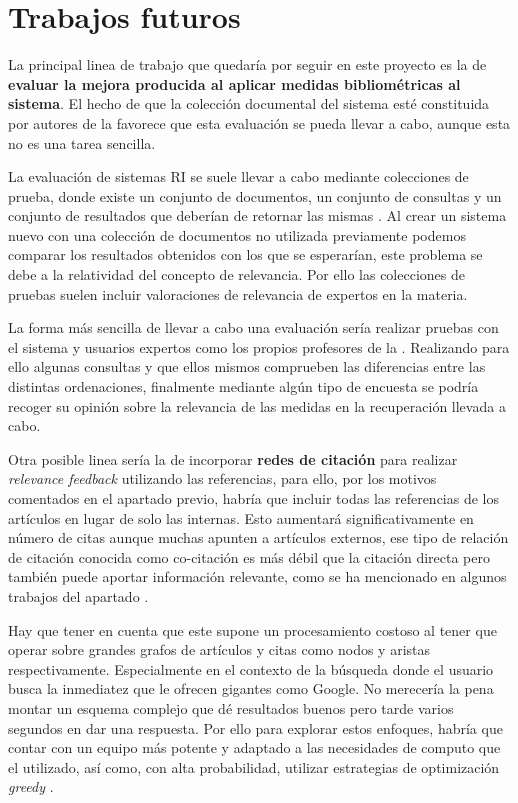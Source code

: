 \section{Trabajos futuros}

La principal linea de trabajo que quedaría por seguir en este proyecto es la de \textbf{evaluar la mejora producida al aplicar medidas bibliométricas al sistema}. El hecho de que la colección documental del sistema esté constituida por autores de la \myFaculty favorece que esta evaluación se pueda llevar a cabo, aunque esta no es una tarea sencilla. 

La evaluación de sistemas \acrshort{RI} se suele llevar a cabo mediante colecciones de prueba, donde existe un conjunto de documentos, un conjunto de consultas y un conjunto de resultados que deberían de retornar las mismas \cite{RI_Evaluation}. Al crear un sistema nuevo con una colección de documentos no utilizada previamente podemos comparar los resultados obtenidos con los que se esperarían, este problema se debe a la relatividad del concepto de relevancia. Por ello las colecciones de pruebas suelen incluir valoraciones de relevancia de expertos en la materia.

La forma más sencilla de llevar a cabo una evaluación sería realizar pruebas con el sistema y usuarios expertos como los propios profesores de la \myFaculty. Realizando para ello algunas consultas y que ellos mismos comprueben las diferencias entre las distintas ordenaciones, finalmente mediante algún tipo de encuesta se podría recoger su opinión sobre la relevancia de las medidas en la recuperación llevada a cabo.

Otra posible linea sería la de incorporar \textbf{redes de citación} para realizar \textit{relevance feedback} \cite{relevanceFeedback} utilizando las referencias, para ello, por los motivos comentados en el apartado previo, habría que incluir todas las referencias de los artículos en lugar de solo las internas. Esto aumentará significativamente en número de citas aunque muchas apunten a artículos externos, ese tipo de relación de citación conocida como co-citación es más débil que la citación directa pero también puede aportar información relevante, como se ha mencionado en algunos trabajos del apartado . 

Hay que tener en cuenta que este supone un procesamiento costoso al tener que operar sobre grandes grafos de artículos y citas como nodos y aristas respectivamente. Especialmente en el contexto de la búsqueda donde el usuario busca la inmediatez que le ofrecen gigantes como Google. No merecería la pena montar un esquema complejo que dé resultados buenos pero tarde varios segundos en dar una respuesta. Por ello para explorar estos enfoques, habría que contar con un equipo más potente y adaptado a las necesidades de computo que el utilizado, así como, con alta probabilidad, utilizar estrategias de optimización \textit{greedy} \cite{greedy}.
